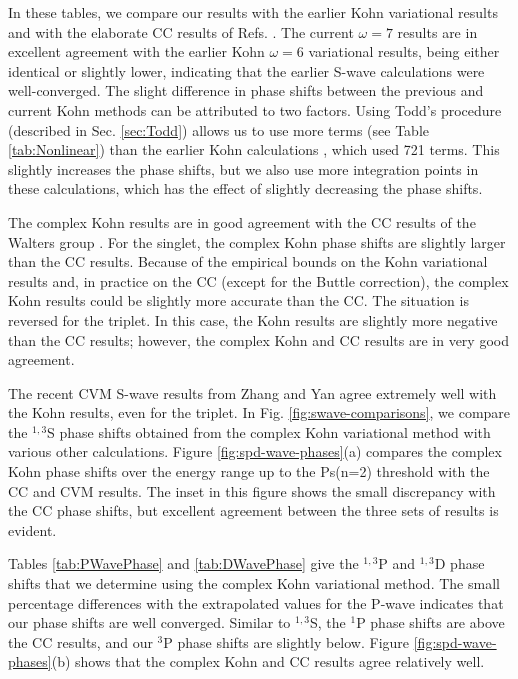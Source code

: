 \documentclass[preprint,showpacs,preprintnumbers,amsmath,amssymb,longbibliography,pra,aps]{revtex4-1}
\begin{document}
In these tables, we compare our results with the earlier Kohn variational results \cite{VanReeth2003,VanReeth2004} and with the elaborate CC results of Refs. \cite{Blackwood2002,Walters2004}. The current $\omega = 7$ results are in excellent agreement with the earlier Kohn $\omega = 6$ variational results, being either identical or slightly lower, indicating that the earlier S-wave calculations were well-converged. The slight difference in phase shifts between the previous and current Kohn methods can be attributed to two factors. Using Todd's procedure (described in Sec. \ref{sec:Todd}) allows us to use more terms (see Table \ref{tab:Nonlinear}) than the earlier Kohn calculations \cite{VanReeth2003,VanReeth2004}, which used 721 terms. This slightly increases the phase shifts, but we also use more integration points in these calculations, which has the effect of slightly decreasing the phase shifts.

The complex Kohn results are in good agreement with the CC results of the Walters group \cite{Blackwood2002,Walters2004}. For the singlet, the complex Kohn phase shifts are slightly larger than the CC results. Because of the empirical bounds on the Kohn variational results and, in practice on the CC (except for the Buttle correction), the complex Kohn results could be slightly more accurate than the CC.
The situation is reversed for the triplet. In this case, the Kohn results are slightly more negative than the CC results; however, the complex Kohn and CC results are in very good agreement.

The recent CVM S-wave results from Zhang and Yan \cite{Zhang2012} agree extremely well with the Kohn results, even for the triplet. In Fig. \ref{fig:swave-comparisons}, we compare the $^{1,3}$S phase shifts obtained from the complex Kohn variational method with various other calculations. Figure \ref{fig:spd-wave-phases}(a) compares the complex Kohn phase shifts over the energy range up to the Ps(n=2) threshold with the CC and CVM results. The inset in this figure shows the small discrepancy with the CC phase shifts, but excellent agreement between the three sets of results is evident. 

Tables \ref{tab:PWavePhase} and \ref{tab:DWavePhase} give the $^{1,3}$P and $^{1,3}$D phase shifts that we determine using the complex Kohn variational method. The small percentage differences with the extrapolated values for the P-wave indicates that our phase shifts are well converged. Similar to $^{1,3}$S, the $^1$P phase shifts are above the CC results, and our $^3$P phase shifts are slightly below. Figure \ref{fig:spd-wave-phases}(b) shows that the complex Kohn and CC results agree relatively well.
\end{document}
